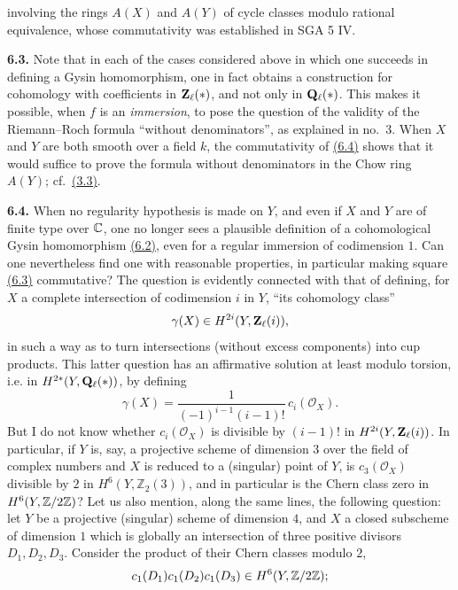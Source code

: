 involving the rings $A(X)$ and $A(Y)$ of cycle classes modulo rational
equivalence, whose commutativity was established in SGA 5 IV.

\noindent{}\textbf{6.3.}
Note that in each of the cases considered above in which one succeeds in
defining a Gysin homomorphism, one in fact obtains a construction for
cohomology with coefficients in $\mathbf Z_\ell(*)$, and not only in $\mathbf Q_\ell(*)$.
This makes it possible, when $f$ is an \emph{immersion}, to pose the question
of the validity of the Riemann--Roch formula ``without denominators'', as
explained in no.~3. When $X$ and $Y$ are both smooth over a field $k$, the
commutativity of \hyperlink{sga6.e14.eq.6-4}{(6.4)} shows that it would suffice to prove the formula
without denominators in the Chow ring $A(Y)$; cf.~\hyperlink{sga6.e14.para.3-3}{(3.3)}.

\noindent{}\textbf{6.4.}
When no regularity hypothesis is made on $Y$, and even if $X$ and $Y$ are of
finite type over $\mathbb C$, one no longer sees a plausible definition of a
cohomological Gysin homomorphism \hyperlink{sga6.e14.para.6-2}{(6.2)}, even for a regular immersion of
codimension $1$. Can one nevertheless find one with reasonable properties,
in particular making square \hyperlink{sga6.e14.para.6-3}{(6.3)} commutative? The question is evidently
connected with that of defining, for $X$ a complete intersection of
codimension $i$ in $Y$, ``its cohomology class''
\[
 \gamma(X)\in H^{2i}(Y,\mathbf Z_\ell(i)),
\]
in such a way as to turn intersections (without excess components) into cup
products. This latter question has an affirmative solution at least modulo
torsion, i.e. in $H^{2*}(Y,\mathbf Q_\ell(*))$, by defining
\[
 \gamma(X)=\frac{1}{(-1)^{i-1}(i-1)!}\,c_i(\mathcal O_X).
\]
But I do not know whether $c_i(\mathcal O_X)$ is divisible by $(i-1)!$ in
$H^{2i}(Y,\mathbf Z_\ell(i))$. In particular, if $Y$ is, say, a projective scheme of
dimension $3$ over the field of complex numbers and $X$ is reduced to a
(singular) point of $Y$, is $c_3(\mathcal O_X)$ divisible by $2$ in
$H^6(Y,\mathbb Z_2(3))$, and in particular is the Chern class zero in
$H^6(Y,\mathbb Z/2\mathbb Z)$? Let us also mention, along the same lines, the following
question: let $Y$ be a projective (singular) scheme of dimension $4$, and
$X$ a closed subscheme of dimension $1$ which is globally an intersection
of three positive divisors $D_1,D_2,D_3$. Consider the product of their
Chern classes modulo $2$,
\[
 c_1(D_1)c_1(D_2)c_1(D_3)\in H^6(Y,\mathbb Z/2\mathbb Z);
\]

